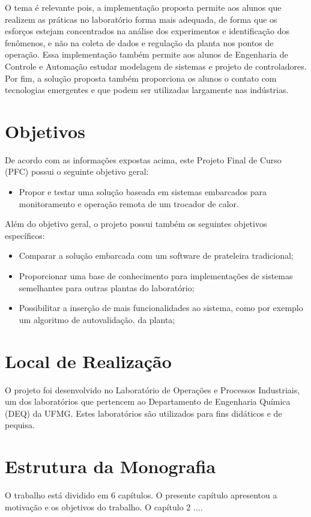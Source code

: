 	O tema é relevante pois, a implementação proposta permite aos alunos que realizem as práticas no laboratório forma mais adequada, de forma que os esforços estejam concentrados na análise dos experimentos e identificação dos fenômenos, e não na coleta de dados e regulação da planta nos pontos de operação. Essa implementação também permite aos alunos de Engenharia de Controle e Automação estudar modelagem de sistemas e projeto de controladores. Por fim, a solução proposta também proporciona os alunos o contato com tecnologias emergentes e que podem ser utilizadas largamente nas indústrias.  
	
		
	
\section{Objetivos}
	De acordo com as informações expostas acima, este Projeto Final de Curso (PFC) possui o seguinte objetivo geral:
	
	\begin{itemize}
		\item 
		Propor e testar uma solução baseada em sistemas embarcados para monitoramento e operação remota de um trocador de calor.
	\end{itemize}
	
	Além do objetivo geral, o projeto possui também os seguintes objetivos específicos:
	
	\begin{itemize}
		\item 
		Comparar a solução embarcada com um software de prateleira tradicional;
		\item 
		Proporcionar uma base de conhecimento para implementações de sistemas semelhantes para outras plantas do laboratório;
		\item 
		Possibilitar a inserção de mais funcionalidades ao sistema, como por exemplo um algoritmo de autovalidação. da planta;
	\end{itemize}
	

\section{Local de Realização}
	O projeto foi desenvolvido no Laboratório de Operações e Processos Industriais, um dos laboratórios que pertencem ao Departamento de Engenharia Química (DEQ) da UFMG. Estes laboratórios são utilizados para fins didáticos e de pequisa.

\section{Estrutura da Monografia}
	O trabalho está dividido em 6 capítulos. O presente capítulo apresentou a motivação e os objetivos do trabalho. O capítulo 2 .... 
